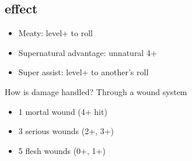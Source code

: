 \documentclass[10pt,letterpaper]{article}
\begin{document}
	\subsection{effect}
	\begin{itemize}
		\item  Meaty: level+ to roll
		\item  Supernatural advantage: unnatural 4+
		\item  Super assist: level+ to another's roll
	\end{itemize}

	How is damage handled?
	Through a wound system
	\begin{itemize}
		\item 1 mortal wound (4+ hit)
		\item 3 serious wounds (2+, 3+)
		\item 5 flesh wounds (0+, 1+)
	\end{itemize}
	
	
	
\end{document}
